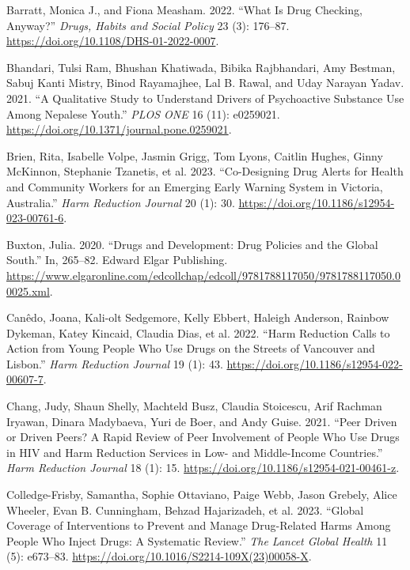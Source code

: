\documentclass[
  letterpaper,
  DIV=11,
  numbers=noendperiod]{scrartcl}
\newlength{\cslhangindent}
\newenvironment{CSLReferences}[2] %
 {\begin{list}{}{%
  \setlength{\itemindent}{0pt}
  \setlength{\leftmargin}{0pt}
  \setlength{\parsep}{0pt}
  \ifodd #1
   \setlength{\leftmargin}{\cslhangindent}
   \setlength{\itemindent}{-1\cslhangindent}
  \fi
  \setlength{\itemsep}{#2\baselineskip}}}
 {\end{list}}
\begin{document}
\label{refs}
\begin{CSLReferences}{1}{0}
Barratt, Monica J., and Fiona Measham. 2022. {``What Is Drug Checking,
Anyway?''} \emph{Drugs, Habits and Social Policy} 23 (3): 176--87.
\url{https://doi.org/10.1108/DHS-01-2022-0007}.

Bhandari, Tulsi Ram, Bhushan Khatiwada, Bibika Rajbhandari, Amy Bestman,
Sabuj Kanti Mistry, Binod Rayamajhee, Lal B. Rawal, and Uday Narayan
Yadav. 2021. {``A Qualitative Study to Understand Drivers of
Psychoactive Substance Use Among Nepalese Youth.''} \emph{PLOS ONE} 16
(11): e0259021. \url{https://doi.org/10.1371/journal.pone.0259021}.

Brien, Rita, Isabelle Volpe, Jasmin Grigg, Tom Lyons, Caitlin Hughes,
Ginny McKinnon, Stephanie Tzanetis, et al. 2023. {``Co-Designing Drug
Alerts for Health and Community Workers for an Emerging Early Warning
System in Victoria, Australia.''} \emph{Harm Reduction Journal} 20 (1):
30. \url{https://doi.org/10.1186/s12954-023-00761-6}.

Buxton, Julia. 2020. {``Drugs and Development: Drug Policies and the
Global South.''} In, 265--82. Edward Elgar Publishing.
\url{https://www.elgaronline.com/edcollchap/edcoll/9781788117050/9781788117050.00025.xml}.

Canêdo, Joana, Kali-olt Sedgemore, Kelly Ebbert, Haleigh Anderson,
Rainbow Dykeman, Katey Kincaid, Claudia Dias, et al. 2022. {``Harm
Reduction Calls to Action from Young People Who Use Drugs on the Streets
of Vancouver and Lisbon.''} \emph{Harm Reduction Journal} 19 (1): 43.
\url{https://doi.org/10.1186/s12954-022-00607-7}.

Chang, Judy, Shaun Shelly, Machteld Busz, Claudia Stoicescu, Arif
Rachman Iryawan, Dinara Madybaeva, Yuri de Boer, and Andy Guise. 2021.
{``Peer Driven or Driven Peers? A Rapid Review of Peer Involvement of
People Who Use Drugs in HIV and Harm Reduction Services in Low- and
Middle-Income Countries.''} \emph{Harm Reduction Journal} 18 (1): 15.
\url{https://doi.org/10.1186/s12954-021-00461-z}.

Colledge-Frisby, Samantha, Sophie Ottaviano, Paige Webb, Jason Grebely,
Alice Wheeler, Evan B. Cunningham, Behzad Hajarizadeh, et al. 2023.
{``Global Coverage of Interventions to Prevent and Manage Drug-Related
Harms Among People Who Inject Drugs: A Systematic Review.''} \emph{The
Lancet Global Health} 11 (5): e673--83.
\url{https://doi.org/10.1016/S2214-109X(23)00058-X}.


\end{CSLReferences}
\end{document}
